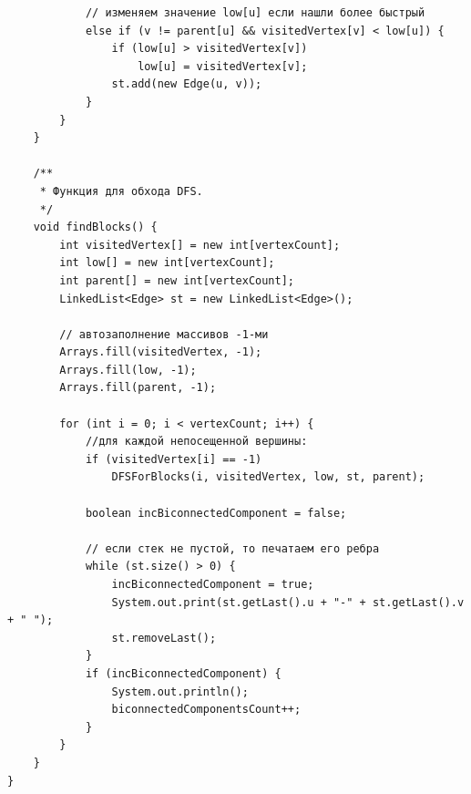 \documentclass[12pt,a4paper]{scrartcl}
\begin{document}
\begin{verbatim}
            // изменяем значение low[u] если нашли более быстрый
            else if (v != parent[u] && visitedVertex[v] < low[u]) {
                if (low[u] > visitedVertex[v])
                    low[u] = visitedVertex[v];
                st.add(new Edge(u, v));
            }
        }
    }

    /**
     * Функция для обхода DFS.
     */
    void findBlocks() {
        int visitedVertex[] = new int[vertexCount];
        int low[] = new int[vertexCount];
        int parent[] = new int[vertexCount];
        LinkedList<Edge> st = new LinkedList<Edge>();

        // автозаполнение массивов -1-ми
        Arrays.fill(visitedVertex, -1);
        Arrays.fill(low, -1);
        Arrays.fill(parent, -1);

        for (int i = 0; i < vertexCount; i++) {
            //для каждой непосещенной вершины:
            if (visitedVertex[i] == -1)
                DFSForBlocks(i, visitedVertex, low, st, parent);

            boolean incBiconnectedComponent = false;

            // если стек не пустой, то печатаем его ребра
            while (st.size() > 0) {
                incBiconnectedComponent = true;
                System.out.print(st.getLast().u + "-" + st.getLast().v + " ");
                st.removeLast();
            }
            if (incBiconnectedComponent) {
                System.out.println();
                biconnectedComponentsCount++;
            }
        }
    }
}
	\end{verbatim}
\end{document}

